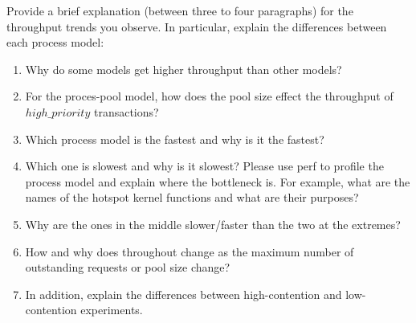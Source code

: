 \documentclass[11pt]{article}
\newcommand{\answer}[1]{}
\newcommand{\answer}[1]{{\color{red}{a: - #1}}}
\begin{document}
Provide a brief explanation (between three to four paragraphs) for the throughput trends you observe. In particular, explain the differences between each process model:
\begin{enumerate}
    \item Why do some models get higher throughput than other models? \\
    \answer{your answer here...}
    \vspace{10mm}

    \item For the proces-pool model, how does the pool size effect the throughput of $high\_priority$ transactions? \\
    \answer{your answer here...}
    \vspace{10mm}

    \item Which process model is the fastest and why is it the fastest?\\
    \answer{your answer here...}
    \vspace{10mm}
    
    \item Which one is slowest and why is it slowest? Please use perf to profile the process model and explain where the bottleneck is. For example, what are the names of the hotspot kernel functions and what are their purposes?\\
    \answer{your answer here...}
    \vspace{10mm}
    
    
    \item Why are the ones in the middle slower/faster than the two at the extremes?\\
    \answer{your answer here...}
    \vspace{10mm}
    
    
    \item How and why does throughout change as the maximum number of outstanding requests or pool size change?\\
    \answer{your answer here...}
    \vspace{10mm}
    
    
    \item In addition, explain the differences between high-contention and low-contention experiments.
    \answer{your answer here...}\\
    \vspace{10mm}

\end{enumerate}
\end{document}
